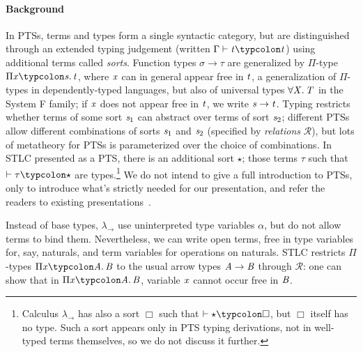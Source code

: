\paragraph{Background}
In PTSs, terms and types form a single syntactic category, but are distinguished
through an extended typing judgement (written \ensuremath{\Gamma\vdash\Varid{t}\typcolon\Varid{t}}) using additional
terms called \emph{sorts}. Function types \ensuremath{\sigma\to \tau} are generalized by
\ensuremath{\Pi}-type \ensuremath{\Pi \Varid{x}\typcolon\Varid{s}\hsforall \hsdot{\circ }{\mathpunct{.}}\Varid{t}}, where \ensuremath{\Varid{x}} can in general appear free in \ensuremath{\Varid{t}},
a generalization of \ensuremath{\Pi}-types in dependently-typed languages, but also of
universal types \ensuremath{\forall \Conid{X}\hsforall \hsdot{\circ }{\mathpunct{.}}\Conid{T}} in the System F family; if \ensuremath{\Varid{x}} does not appear
free in \ensuremath{\Varid{t}}, we write \ensuremath{\Varid{s}\to \Varid{t}}.
Typing restricts whether terms of some sort \ensuremath{\Varid{s}_{1}} can abstract over terms of sort
\ensuremath{\Varid{s}_{2}}; different PTSs allow different combinations of sorts \ensuremath{\Varid{s}_{1}} and \ensuremath{\Varid{s}_{2}}
(specified by \emph{relations} \ensuremath{\mathcal{R}}), but
lots of metatheory for PTSs is parameterized over the choice of combinations.
In STLC presented as a PTS, there is an additional
sort \ensuremath{\star}; those terms \ensuremath{\tau} such that \ensuremath{\vdash\tau\typcolon\star} are
types.\footnote{Calculus \ensuremath{\lambda_{\to}} has also a sort \ensuremath{\Box} such that \ensuremath{\vdash\star\typcolon\Box},
but \ensuremath{\Box} itself has no type. Such a sort appears only in PTS typing
derivations, not in well-typed terms themselves, so we do not discuss it
further.} We do not intend to give a full introduction to PTSs, only to
introduce what's strictly needed for our presentation, and refer the readers to
existing presentations~\citep{Barendregt1992lambda}.

Instead of base types, \ensuremath{\lambda_{\to}} use uninterpreted type variables \ensuremath{\alpha}, but
do not allow terms to bind them. Nevertheless, we can write open terms, free in
type variables for, say, naturals, and term variables for operations on
naturals. STLC restricts \ensuremath{\Pi}-types \ensuremath{\Pi \Varid{x}\typcolon\Conid{A}\hsforall \hsdot{\circ }{\mathpunct{.}}\Conid{B}} to the usual arrow types \ensuremath{\Conid{A}\to \Conid{B}} through \ensuremath{\mathcal{R}}: one can show that in \ensuremath{\Pi \Varid{x}\typcolon\Conid{A}\hsforall \hsdot{\circ }{\mathpunct{.}}\Conid{B}}, variable \ensuremath{\Varid{x}}
cannot occur free in \ensuremath{\Conid{B}}.

